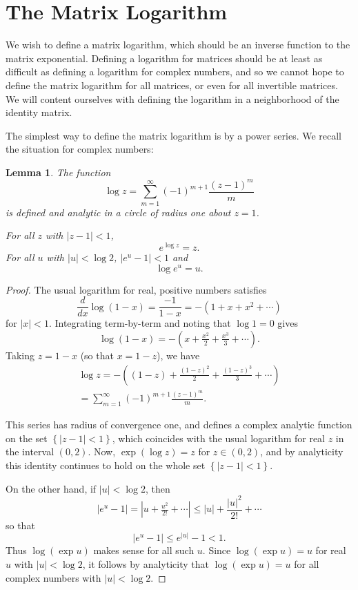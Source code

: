 \documentclass[12pt]{amsbook}
\theoremstyle{plain}
\newtheorem{lemma}[theorem]{Lemma}
\numberwithin{equation}{chapter}
\numberwithin{theorem}{chapter}
\begin{document}
\section{The Matrix Logarithm\label{matrix.log}}

We wish to define a matrix logarithm, which should be an inverse function to
the matrix exponential. Defining a logarithm for matrices should be at least
as difficult as defining a logarithm for complex numbers, and so we cannot
hope to define the matrix logarithm for all matrices, or even for all
invertible matrices. We will content ourselves with defining the logarithm in
a neighborhood of the identity matrix.

The simplest way to define the matrix logarithm is by a power series. We
recall the situation for complex numbers:

\begin{lemma}
The function
\[
\log z=\sum_{m=1}^{\infty}(-1)^{m+1}\frac{(z-1)^{m}}{m}%
\]
is defined and analytic in a circle of radius one about $z=1$.

For all $z$ with $\left|  z-1\right|  <1$,
\[
e^{\log z}=z\text{.}%
\]
For all $u$ with $\left|  u\right|  <\log2$, $\left|  e^{u}-1\right|  <1$ and
\[
\log e^{u}=u\text{.}%
\]
\end{lemma}

\begin{proof}
The usual logarithm for real, positive numbers satisfies
\[
\frac{d}{dx}\log(1-x)=\frac{-1}{1-x}=-\left(  1+x+x^{2}+\cdots\right)
\]
for $\left|  x\right|  <1$. Integrating term-by-term and noting that $\log1=0$
gives
\[
\log(1-x)=-\left(  x+\tfrac{x^{2}}{2}+\tfrac{x^{3}}{3}+\cdots\right)  \text{.}%
\]
Taking $z=1-x$ (so that $x=1-z$), we have
\begin{align*}
\log z=-\left(  (1-z)+\tfrac{(1-z)^{2}}{2}+\tfrac{(1-z)^{3}}{3}+\cdots\right)
\\
=\sum_{m=1}^{\infty}(-1)^{m+1}\frac{(z-1)^{m}}{m}\text{.}%
\end{align*}

This series has radius of convergence one, and defines a complex analytic
function on the set $\left\{  \left|  z-1\right|  <1\right\}  $, which
coincides with the usual logarithm for real $z$ in the interval $(0,2)$. Now,
$\exp(\log z)=z$ for $z\in(0,2)$, and by analyticity this identity continues
to hold on the whole set $\left\{  \left|  z-1\right|  <1\right\}  $.

On the other hand, if $\left|  u\right|  <\log2$, then
\[
\left|  e^{u}-1\right|  =\left|  u+\tfrac{u^{2}}{2!}+\cdots\right|
\leq\left|  u\right|  +\frac{\left|  u\right|  ^{2}}{2!}+\cdots
\]
so that
\[
\left|  e^{u}-1\right|  \leq e^{\left|  u\right|  }-1<1\text{.}%
\]
Thus $\log(\exp u)$ makes sense for all such $u$. Since $\log(\exp u)=u$ for
real $u$ with $\left|  u\right|  <\log2$, it follows by analyticity that
$\log(\exp u)=u$ for all complex numbers with $\left|  u\right|  <\log2$.
\end{proof}
\end{document}
